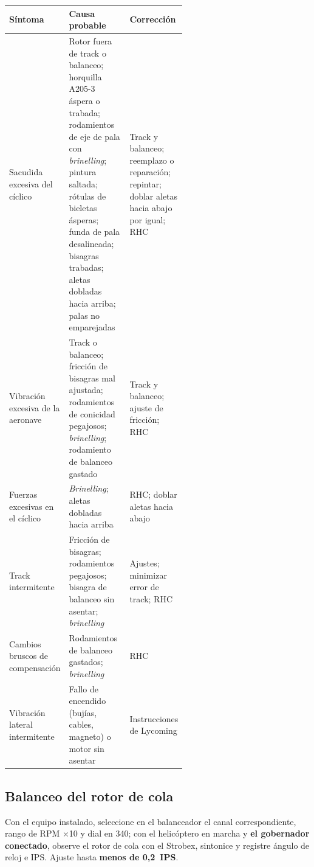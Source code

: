\begin{center}
\small
\begin{tabularx}{\linewidth}{@{}>{\raggedright\arraybackslash}p{0.22\linewidth}>{\raggedright\arraybackslash}p{0.36\linewidth}>{\raggedright\arraybackslash}X@{}}
\toprule
Síntoma & Causa probable & Corrección \\
\midrule
Sacudida excesiva del cíclico & Rotor fuera de track o balanceo; horquilla A205-3 áspera o trabada; rodamientos de eje de pala con \emph{brinelling}; pintura saltada; rótulas de bieletas ásperas; funda de pala desalineada; bisagras trabadas; aletas dobladas hacia arriba; palas no emparejadas & Track y balanceo; reemplazo o reparación; repintar; doblar aletas hacia abajo por igual; RHC \\
Vibración excesiva de la aeronave & Track o balanceo; fricción de bisagras mal ajustada; rodamientos de conicidad pegajosos; \emph{brinelling}; rodamiento de balanceo gastado & Track y balanceo; ajuste de fricción; RHC \\
Fuerzas excesivas en el cíclico & \emph{Brinelling}; aletas dobladas hacia arriba & RHC; doblar aletas hacia abajo \\
Track intermitente & Fricción de bisagras; rodamientos pegajosos; bisagra de balanceo sin asentar; \emph{brinelling} & Ajustes; minimizar error de track; RHC \\
Cambios bruscos de compensación & Rodamientos de balanceo gastados; \emph{brinelling} & RHC \\
Vibración lateral intermitente & Fallo de encendido (bujías, cables, magneto) o motor sin asentar & Instrucciones de Lycoming \\
\bottomrule
\end{tabularx}
\end{center}

\subsection{Balanceo del rotor de cola}

Con el equipo instalado, seleccione en el balanceador el canal correspondiente, rango de RPM $\times$10 y dial en 340; con el helicóptero en marcha y \textbf{el gobernador conectado}, observe el rotor de cola con el Strobex, sintonice y registre ángulo de reloj e IPS. Ajuste hasta \textbf{menos de 0,2~IPS}.

